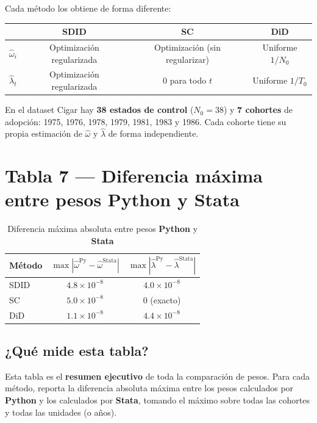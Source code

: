 \documentclass[11pt, a4paper]{article}
\newcommand{\py}{\textcolor{pyblue}{\textbf{Python}}}
\newcommand{\st}{\textcolor{stgreen}{\textbf{Stata}}}
\begin{document}
Cada método los obtiene de forma diferente:

\begin{center}
\begin{tabular}{lccc}
\toprule
& \textbf{SDID} & \textbf{SC} & \textbf{DiD} \\
\midrule
$\hat{\omega}_i$ & Optimización regularizada & Optimización (sin regularizar) & Uniforme $1/N_0$ \\
$\hat{\lambda}_t$ & Optimización regularizada & $0$ para todo $t$ & Uniforme $1/T_0$ \\
\bottomrule
\end{tabular}
\end{center}

En el dataset Cigar hay \textbf{38 estados de control} ($N_0=38$) y \textbf{7 cohortes}
de adopción: 1975, 1976, 1978, 1979, 1981, 1983 y 1986.
Cada cohorte tiene su propia estimación de $\hat{\omega}$ y $\hat{\lambda}$ de forma independiente.

\newpage
\section{Tabla 7 — Diferencia máxima entre pesos Python y Stata}

\begin{table}[H]
\centering
\caption{Diferencia máxima absoluta entre pesos \py{} y \st{}}
\begin{tabular}{lcc}
\toprule
\textbf{Método} & $\max|\hat{\omega}^{\text{Py}} - \hat{\omega}^{\text{Stata}}|$ &
                  $\max|\hat{\lambda}^{\text{Py}} - \hat{\lambda}^{\text{Stata}}|$ \\
\midrule
\rowcolor{sdidcolor}
SDID & $4.8 \times 10^{-8}$ & $4.0 \times 10^{-8}$ \\
\rowcolor{sccolor}
SC   & $5.0 \times 10^{-8}$ & $0$ (exacto) \\
\rowcolor{didcolor}
DiD  & $1.1 \times 10^{-8}$ & $4.4 \times 10^{-8}$ \\
\bottomrule
\end{tabular}
\end{table}

\subsection*{¿Qué mide esta tabla?}

Esta tabla es el \textbf{resumen ejecutivo} de toda la comparación de pesos.
Para cada método, reporta la diferencia absoluta máxima entre los pesos calculados
por \py{} y los calculados por \st{}, tomando el máximo sobre todas las cohortes
y todas las unidades (o años).
\end{document}
